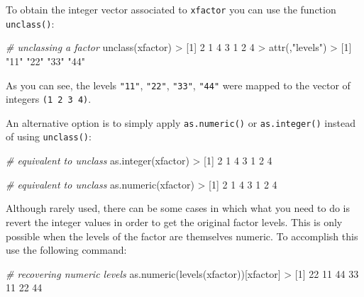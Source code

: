 \documentclass[
]{book}
\newenvironment{Shaded}{\begin{snugshade}}{\end{snugshade}}
\newcommand{\CommentTok}[1]{\textcolor[rgb]{0.56,0.35,0.01}{\textit{#1}}}
\newcommand{\DecValTok}[1]{\textcolor[rgb]{0.00,0.00,0.81}{#1}}
\newcommand{\FunctionTok}[1]{\textcolor[rgb]{0.00,0.00,0.00}{#1}}
\newcommand{\NormalTok}[1]{#1}
\newcommand{\SpecialCharTok}[1]{\textcolor[rgb]{0.00,0.00,0.00}{#1}}
\newcommand{\StringTok}[1]{\textcolor[rgb]{0.31,0.60,0.02}{#1}}
\begin{document}
To obtain the integer vector associated to \texttt{xfactor} you can use the function
\texttt{unclass()}:

\begin{Shaded}
\begin{Highlighting}[]
\CommentTok{\# unclassing a factor}
\FunctionTok{unclass}\NormalTok{(xfactor)}
\SpecialCharTok{\textgreater{}}\NormalTok{ [}\DecValTok{1}\NormalTok{] }\DecValTok{2} \DecValTok{1} \DecValTok{4} \DecValTok{3} \DecValTok{1} \DecValTok{2} \DecValTok{4}
\SpecialCharTok{\textgreater{}} \FunctionTok{attr}\NormalTok{(,}\StringTok{"levels"}\NormalTok{)}
\SpecialCharTok{\textgreater{}}\NormalTok{ [}\DecValTok{1}\NormalTok{] }\StringTok{"11"} \StringTok{"22"} \StringTok{"33"} \StringTok{"44"}
\end{Highlighting}
\end{Shaded}

As you can see, the levels \texttt{"11"}, \texttt{"22"}, \texttt{"33"}, \texttt{"44"} were mapped to the
vector of integers \texttt{(1\ 2\ 3\ 4)}.

An alternative option is to simply apply \texttt{as.numeric()} or \texttt{as.integer()}
instead of using \texttt{unclass()}:

\begin{Shaded}
\begin{Highlighting}[]
\CommentTok{\# equivalent to unclass}
\FunctionTok{as.integer}\NormalTok{(xfactor)}
\SpecialCharTok{\textgreater{}}\NormalTok{ [}\DecValTok{1}\NormalTok{] }\DecValTok{2} \DecValTok{1} \DecValTok{4} \DecValTok{3} \DecValTok{1} \DecValTok{2} \DecValTok{4}

\CommentTok{\# equivalent to unclass}
\FunctionTok{as.numeric}\NormalTok{(xfactor)}
\SpecialCharTok{\textgreater{}}\NormalTok{ [}\DecValTok{1}\NormalTok{] }\DecValTok{2} \DecValTok{1} \DecValTok{4} \DecValTok{3} \DecValTok{1} \DecValTok{2} \DecValTok{4}
\end{Highlighting}
\end{Shaded}

Although rarely used, there can be some cases in which what you need to do is
revert the integer values in order to get the original factor levels. This is
only possible when the levels of the factor are themselves numeric. To accomplish
this use the following command:

\begin{Shaded}
\begin{Highlighting}[]
\CommentTok{\# recovering numeric levels}
\FunctionTok{as.numeric}\NormalTok{(}\FunctionTok{levels}\NormalTok{(xfactor))[xfactor]}
\SpecialCharTok{\textgreater{}}\NormalTok{ [}\DecValTok{1}\NormalTok{] }\DecValTok{22} \DecValTok{11} \DecValTok{44} \DecValTok{33} \DecValTok{11} \DecValTok{22} \DecValTok{44}
\end{Highlighting}
\end{Shaded}
\end{document}
